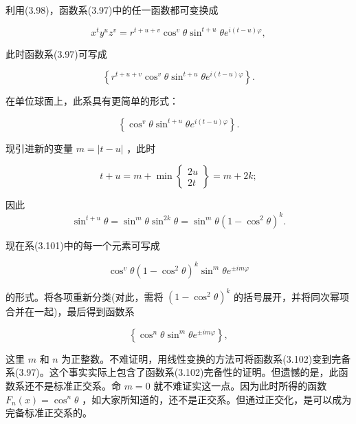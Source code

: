 利用(3.98)，函数系(3.97)中的任一函数都可变换成

\begin{equation*}
x ^ {t} y ^ {u} z ^ {v} = r ^ {t + u + v} \cos^ {v} \theta \sin^ {t + u} \theta e ^ {i (t - u) \varphi},\tag{3.99}
\end{equation*}

此时函数系(3.97)可写成

\begin{equation*}
\left\{r ^ {t + u + v} \cos^ {v} \theta \sin^ {t + u} \theta e ^ {i (t - u) \varphi} \right\}.\tag{3.100}
\end{equation*}

在单位球面上，此系具有更简单的形式：

\begin{equation*}
\left\{\cos^ {v} \theta \sin^ {t + u} \theta e ^ {i (t - u) \varphi} \right\}.\tag{3.101}
\end{equation*}

现引进新的变量 $m = |t - u|$ ，此时

\begin{equation*}
t + u = m + \min \left\{ \begin{array}{l} 2 u \\ 2 t \end{array} \right\} = m + 2 k;
\end{equation*}

因此
\begin{equation*}
\sin^ {t + u} \theta = \sin^ {m} \theta \sin^ {2 k} \theta = \sin^ {m} \theta (1 - \cos^ {2} \theta) ^ {k}.
\end{equation*}

现在系(3.101)中的每一个元素可写成

\begin{equation*}
\cos^ {v} \theta (1 - \cos^ {2} \theta) ^ {k} \sin^ {m} \theta e ^ {\pm i m \varphi}
\end{equation*}

的形式。将各项重新分类(对此，需将 $(1-\cos^{2}\theta)^{k}$ 的括号展开，并将同次幂项合并在一起)，最后得到函数系

\begin{equation*}
\left\{\cos^ {n} \theta \sin^ {m} \theta e ^ {\pm i m \varphi} \right\},\tag{3.102}
\end{equation*}

这里 $m$ 和 $n$ 为正整数。不难证明，用线性变换的方法可将函数系(3.102)变到完备系(3.97)。这个事实实际上包含了函数系(3.102)完备性的证明。但遗憾的是，此函数系还不是标准正交系。命 $m = 0$ 就不难证实这一点。因为此时所得的函数 $F_{n}(x) = \cos^{n}\theta$ ，如大家所知道的，还不是正交系。但通过正交化，是可以成为完备标准正交系的。

